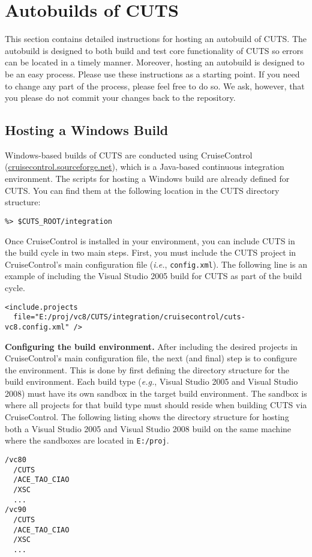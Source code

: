 
\chapter{Autobuilds of CUTS}

This section contains detailed instructions for hosting an 
autobuild of CUTS. The autobuild is designed to both build 
and test core functionality of CUTS so errors can be located 
in a timely manner. Moreover, hosting an autobuild is designed
to be an easy process. Please use these instructions as a 
starting point. If you need to change any part of the process,
please feel free to do so. We ask, however, that you please
do not commit your changes back to the repository. 

\section{Hosting a Windows Build}

Windows-based builds of CUTS are conducted using CruiseControl 
(\url{cruisecontrol.sourceforge.net}), which is a Java-based
continuous integration environment. The scripts for hosting a
Windows build are already defined for CUTS. You can find them
at the following location in the CUTS directory structure:
\begin{lstlisting}
%> $CUTS_ROOT/integration
\end{lstlisting}

Once CruiseControl is installed in your environment, you 
can include CUTS in the build cycle in two main steps. First,
you must include the CUTS project in CruiseControl's main 
configuration file (\textit{i.e.}, \texttt{config.xml}). The 
following line is an example of including the Visual Studio
2005 build for CUTS as part of the build cycle.
\begin{lstlisting}
<include.projects 
  file="E:/proj/vc8/CUTS/integration/cruisecontrol/cuts-vc8.config.xml" />
\end{lstlisting}

\textbf{Configuring the build environment.}
After including the desired projects in CruiseControl's main 
configuration file, the next (and final) step is to configure
the environment. This is done by first defining the directory 
structure for the build environment. Each build type (\textit{e.g.},
Visual Studio 2005 and Visual Studio 2008) must have its own
sandbox in the target build environment. The sandbox is where
all projects for that build type must should reside when building
CUTS via CruiseControl. The following listing shows the directory
structure for hosting both a Visual Studio 2005 and Visual Studio 
2008 build on the same machine where the sandboxes are located in
\texttt{E:/proj}.
\begin{lstlisting}
/vc80
  /CUTS
  /ACE_TAO_CIAO
  /XSC
  ...
/vc90
  /CUTS
  /ACE_TAO_CIAO
  /XSC
  ...
\end{lstlisting}

